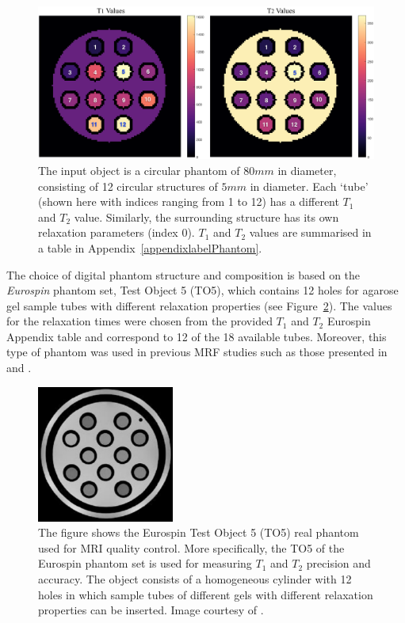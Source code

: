 \begin{figure}[ht]
    \centering
    \includegraphics[angle=0,width=1\textwidth, keepaspectratio]{images/mrf/inputObject}
    \caption{The input object is a circular phantom of $80mm$ in diameter, consisting of 12 circular structures of $5mm$ in diameter. Each `tube' (shown here with indices ranging from 1 to 12) has a different $T_1$ and $T_2$ value. Similarly, the surrounding structure has its own relaxation parameters (index 0). $T_1$ and $T_2$ values are summarised in a table in Appendix~\ref{appendixlabelPhantom}.}
    \label{fig:inputObject}
\end{figure}

\hfill

The choice of digital phantom structure and composition is based on the \textit{Eurospin} 
phantom set, Test Object 5 (TO5), which contains 12 holes for agarose gel sample tubes with different relaxation properties \cite{Ihalainen2004} (see Figure~\ref{fig:realPhantom}).
The values for the relaxation times were chosen from the provided $T_1$ and $T_2$ Eurospin Appendix table and correspond to 12 of the 18 available tubes.
Moreover, this type of phantom was used in previous MRF studies such as those presented in \cite{Doneva2016} and \cite{Sommer2017}.

\begin{figure}[ht]
    \centering
    \includegraphics[angle=0,width=0.4\textwidth, keepaspectratio]{images/mrf/realPhantom}
    \caption{The figure shows the Eurospin Test Object 5 (TO5) real phantom used for MRI quality control.
    More specifically, the TO5 of the Eurospin phantom set is used for measuring $T_1$ and $T_2$ precision and accuracy.
    The object consists of a homogeneous cylinder with 12 holes in which sample tubes of different gels with different relaxation properties can be inserted. Image courtesy of \cite{Ihalainen2004}.}
    \label{fig:realPhantom}
\end{figure}

